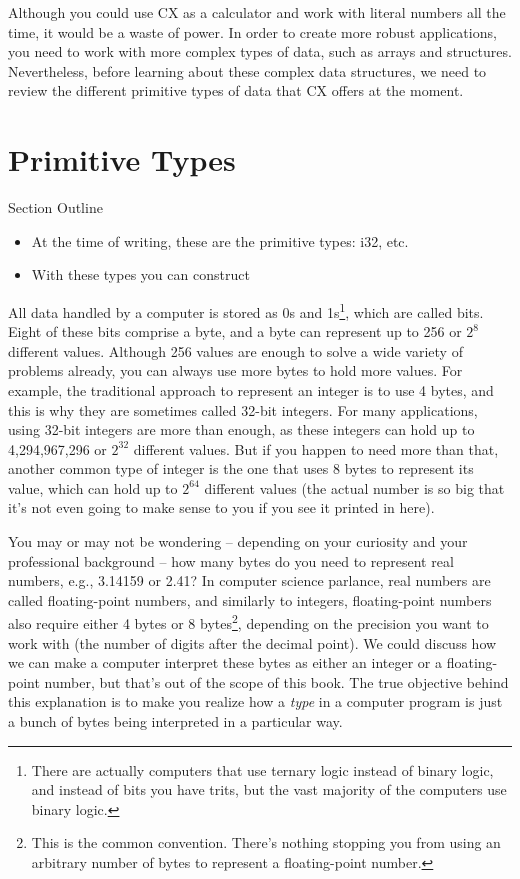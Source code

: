 \documentclass[11pt,fleqn,openany]{book} %
\begin{document}
Although you could use CX as a calculator and work with literal numbers all the time, it would be a waste of power. In order to create more robust applications, you need to work with more complex types of data, such as arrays and structures. Nevertheless, before learning about these complex data structures, we need to review the different primitive types of data that CX offers at the moment.

\section{Primitive Types}

\begin{remark}
Section Outline
    \begin{itemize}
    	\item At the time of writing, these are the primitive types: i32, etc.
        \item With these types you can construct
    \end{itemize}
\end{remark}

All data handled by a computer is stored as 0s and 1s\footnote{There are actually computers that use ternary logic instead of binary logic, and instead of bits you have trits, but the vast majority of the computers use binary logic.}, which are called bits. Eight of these bits comprise a byte, and a byte can represent up to 256 or $2^8$ different values. Although 256 values are enough to solve a wide variety of problems already, you can always use more bytes to hold more values. For example, the traditional approach to represent an integer is to use 4 bytes, and this is why they are sometimes called 32-bit integers. For many applications, using 32-bit integers are more than enough, as these integers can hold up to 4,294,967,296 or $2^{32}$ different values. But if you happen to need more than that, another common type of integer is the one that uses 8 bytes to represent its value, which can hold up to $2^{64}$ different values (the actual number is so big that it's not even going to make sense to you if you see it printed in here).

You may or may not be wondering -- depending on your curiosity and your professional background -- how many bytes do you need to represent real numbers, e.g., 3.14159 or 2.41? In computer science parlance, real numbers are called floating-point numbers, and similarly to integers, floating-point numbers also require either 4 bytes or 8 bytes\footnote{This is the common convention. There's nothing stopping you from using an arbitrary number of bytes to represent a floating-point number.}, depending on the precision you want to work with (the number of digits after the decimal point). We could discuss how we can make a computer interpret these bytes as either an integer or a floating-point number, but that's out of the scope of this book. The true objective behind this explanation is to make you realize how a \emph{type} in a computer program is just a bunch of bytes being interpreted in a particular way.
\end{document}
